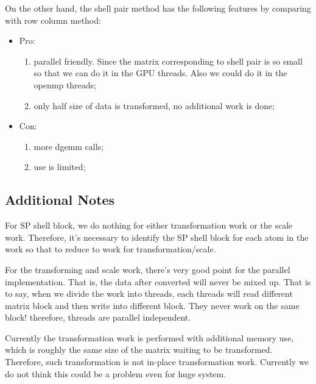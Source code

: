 On the other hand, the shell pair method has the following features 
by comparing with row column method:
\begin{itemize}
 \item Pro:
  \begin{enumerate}
   \item   parallel friendly. Since the matrix corresponding to shell pair is so small so 
           that we can do it in the GPU threads. Also we could do it in the openmp threads;
   \item   only half size of data is transformed, no additional work is done;
  \end{enumerate}
 \item Con:
   \begin{enumerate}
    \item more dgemm calls;
	 \item use is limited;
 \end{enumerate}
\end{itemize}
    
\subsection{Additional Notes} 
 
For SP shell block, we do nothing for either transformation work or the scale work.
Therefore, it’s necessary to identify the SP shell block for each atom in the work 
so that to reduce to work for transformation/scale.

For the transforming and scale work, there’s very good point for the parallel
implementation. That is, the data after converted will never be mixed up. That 
is to say, when we divide the work into threads, each threads will read different 
matrix block and then write into different block. They never work on the same block! 
therefore, threads are parallel independent.

Currently the transformation work is performed with additional memory use, which 
is roughly the same size of the matrix waiting to be transformed. Therefore, such
transformation is not in-place transformation work. Currently we do not think this
could be a problem even for huge system.



